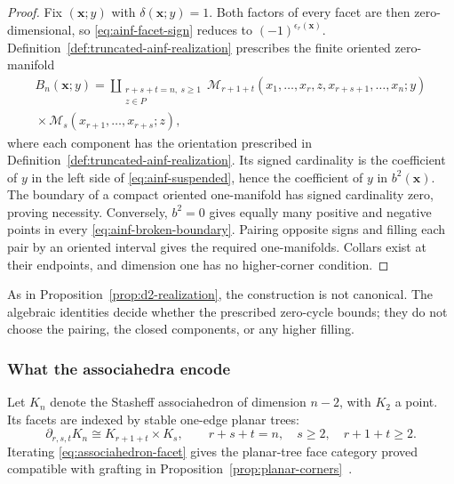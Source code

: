 \documentclass[11pt,letterpaper,twoside]{article}
\theoremstyle{plain}
\theoremstyle{definition}
\theoremstyle{remark}
\let\cite\citep
\begin{document}
\begin{proof}
Fix \((\mathbf x;y)\) with \(\delta(\mathbf x;y)=1\).  Both factors of every facet are then zero-dimensional, so \eqref{eq:ainf-facet-sign} reduces to \((-1)^{\epsilon_r(\mathbf x)}\).  Definition~\ref{def:truncated-ainf-realization} prescribes the finite oriented zero-manifold
\begin{multline}\label{eq:ainf-broken-boundary}
 B_n(\mathbf x;y)
 =
 \coprod_{\substack{r+s+t=n,\ s\geq1\\z\in P}}
 \mathcal M_{r+1+t}
 (x_1,\ldots,x_r,z,x_{r+s+1},\ldots,x_n;y)
 \\
 {}\times
 \mathcal M_s(x_{r+1},\ldots,x_{r+s};z),
\end{multline}
where each component has the orientation prescribed in Definition~\ref{def:truncated-ainf-realization}.  Its signed cardinality is the coefficient of \(y\) in the left side of \eqref{eq:ainf-suspended}, hence the coefficient of \(y\) in \(b^2(\mathbf x)\).  The boundary of a compact oriented one-manifold has signed cardinality zero, proving necessity.  Conversely, \(b^2=0\) gives equally many positive and negative points in every \eqref{eq:ainf-broken-boundary}.  Pairing opposite signs and filling each pair by an oriented interval gives the required one-manifolds.  Collars exist at their endpoints, and dimension one has no higher-corner condition.
\end{proof}

As in Proposition~\ref{prop:d2-realization}, the construction is not canonical.  The algebraic identities decide whether the prescribed zero-cycle bounds; they do not choose the pairing, the closed components, or any higher filling.

\subsubsection{What the associahedra encode}

Let \(K_n\) denote the Stasheff associahedron of dimension \(n-2\), with \(K_2\) a point.  Its facets are indexed by stable one-edge planar trees:
\begin{equation}\label{eq:associahedron-facet}
 \partial_{r,s,t}K_n
 \cong K_{r+1+t}\times K_s,
 \qquad
 r+s+t=n,\quad s\geq2,\quad r+1+t\geq2.
\end{equation}
Iterating \eqref{eq:associahedron-facet} gives the planar-tree face category proved compatible with grafting in Proposition~\ref{prop:planar-corners}~\cite{stasheff1963}.
\end{document}
